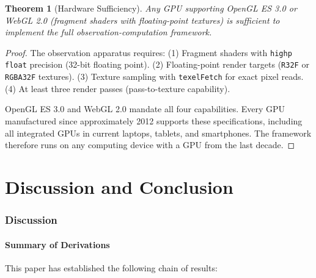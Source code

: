 \documentclass[11pt,twocolumn,a4paper]{article}
\newtheorem{theorem}{Theorem}[section]
\theoremstyle{definition}
\theoremstyle{remark}
\begin{document}
\begin{theorem}[Hardware Sufficiency]
\label{thm:hardware_sufficiency}
Any GPU supporting OpenGL ES 3.0 or WebGL 2.0 (fragment shaders with floating-point textures) is sufficient to implement the full observation-computation framework.
\end{theorem}

\begin{proof}
The observation apparatus requires: (1) Fragment shaders with \texttt{highp float} precision (32-bit floating point). (2) Floating-point render targets (\texttt{R32F} or \texttt{RGBA32F} textures). (3) Texture sampling with \texttt{texelFetch} for exact pixel reads. (4) At least three render passes (pass-to-texture capability).

OpenGL ES 3.0 \citep{glsl_es3_spec} and WebGL 2.0 \citep{webgl2_spec} mandate all four capabilities. Every GPU manufactured since approximately 2012 supports these specifications, including all integrated GPUs in current laptops, tablets, and smartphones. The framework therefore runs on any computing device with a GPU from the last decade.
\end{proof}



\part{Discussion and Conclusion}

\section{Discussion}
\label{sec:discussion}

\subsection{Summary of Derivations}

This paper has established the following chain of results:
\end{document}
